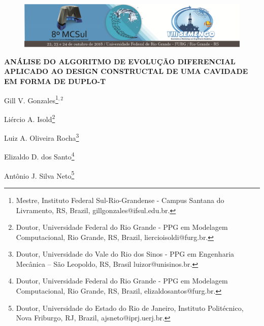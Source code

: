 \documentclass[12pt,A4,A4pt]{article}
\begin{document}


\begin{figure}
\centering
\vspace{-1cm}
\begin{minipage}[c]{\textwidth}
\centering
    \includegraphics[width=6.2in]{cabecalho.eps}
\end{minipage}
\end{figure}



\begin{center}
\fontsize{16pt}{\baselineskip}\selectfont 
\textbf{{ANÁLISE DO ALGORITMO DE EVOLUÇÃO DIFERENCIAL APLICADO AO DESIGN CONSTRUCTAL DE UMA CAVIDADE EM FORMA DE DUPLO-T}}
\end{center}
\vspace{-0.9cm}

\begin{flushright}
Gill V. Gonzales\footnote{Mestre, Instituto Federal Sul-Rio-Grandense - Campus Santana do Livramento, RS, Brazil, gillgonzales@ifsul.edu.br.}$^{,2}$

Liércio A. Isold\footnote{Doutor, Universidade Federal do Rio Grande - PPG em Modelagem Computacional, Rio Grande, RS, Brazil, liercioisoldi@furg.br.}

Luiz A. Oliveira Rocha\footnote{Doutor, Universidade do Vale do Rio dos Sinos - PPG em Engenharia Mecânica – São Leopoldo, RS, Brasil luizor@unisinos.br.}

Elizaldo D. dos Santo\footnote{Doutor, Universidade Federal do Rio Grande - PPG em Modelagem Computacional, Rio Grande, RS, Brazil, elizaldosantos@furg.br.}

Antônio J. Silva Neto\footnote{Doutor, Universidade do Estado do Rio de Janeiro, Instituto Politécnico, Nova Friburgo, RJ, Brazil, ajsneto@iprj.uerj.br.}

\end{flushright}
\end{document}
